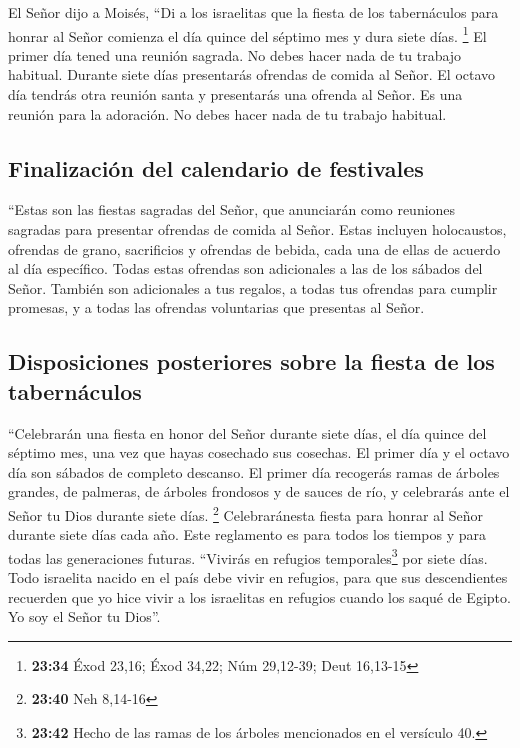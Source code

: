  El Señor dijo a Moisés,  ``Di a los
israelitas que la fiesta de los tabernáculos para honrar al Señor
comienza el día quince del séptimo mes y dura siete días. \footnote{\textbf{23:34}
  Éxod 23,16; Éxod 34,22; Núm 29,12-39; Deut 16,13-15} 
El primer día tened una reunión sagrada. No debes hacer nada de tu
trabajo habitual.  Durante siete días presentarás
ofrendas de comida al Señor. El octavo día tendrás otra reunión santa y
presentarás una ofrenda al Señor. Es una reunión para la adoración. No
debes hacer nada de tu trabajo habitual.

\hypertarget{finalizaciuxf3n-del-calendario-de-festivales}{%
\subsection{Finalización del calendario de
festivales}\label{finalizaciuxf3n-del-calendario-de-festivales}}

 ``Estas son las fiestas sagradas del Señor, que
anunciarán como reuniones sagradas para presentar ofrendas de comida al
Señor. Estas incluyen holocaustos, ofrendas de grano, sacrificios y
ofrendas de bebida, cada una de ellas de acuerdo al día específico.
 Todas estas ofrendas son adicionales a las de los
sábados del Señor. También son adicionales a tus regalos, a todas tus
ofrendas para cumplir promesas, y a todas las ofrendas voluntarias que
presentas al Señor.

\hypertarget{disposiciones-posteriores-sobre-la-fiesta-de-los-tabernuxe1culos}{%
\subsection{Disposiciones posteriores sobre la fiesta de los
tabernáculos}\label{disposiciones-posteriores-sobre-la-fiesta-de-los-tabernuxe1culos}}

 ``Celebrarán una fiesta en honor del Señor durante siete
días, el día quince del séptimo mes, una vez que hayas cosechado sus
cosechas. El primer día y el octavo día son sábados de completo
descanso.  El primer día recogerás ramas de árboles
grandes, de palmeras, de árboles frondosos y de sauces de río, y
celebrarás ante el Señor tu Dios durante siete días. \footnote{\textbf{23:40}
  Neh 8,14-16}  Celebraránesta fiesta para honrar al
Señor durante siete días cada año. Este reglamento es para todos los
tiempos y para todas las generaciones futuras.  ``Vivirás
en refugios temporales\footnote{\textbf{23:42} Hecho de las ramas de los
  árboles mencionados en el versículo 40.} por siete días. Todo
israelita nacido en el país debe vivir en refugios,  para
que sus descendientes recuerden que yo hice vivir a los israelitas en
refugios cuando los saqué de Egipto. Yo soy el Señor tu Dios''.

